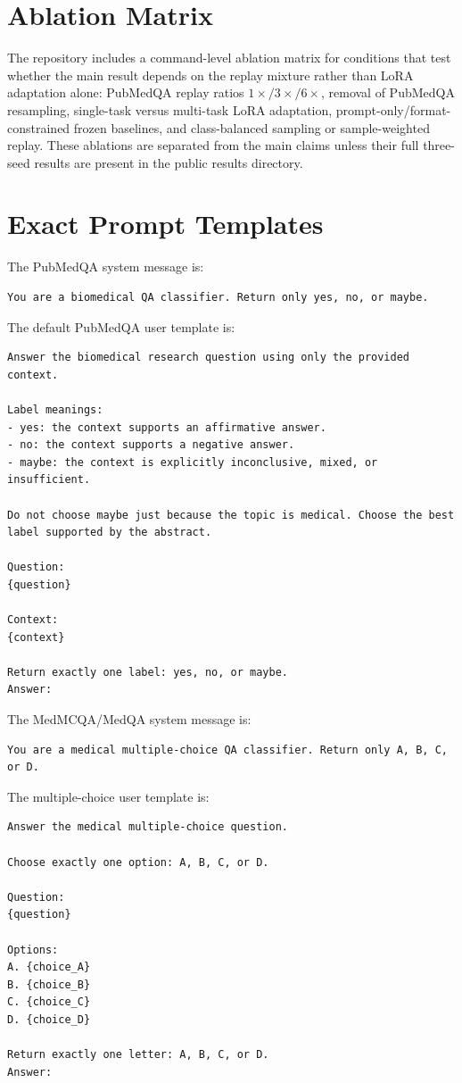\documentclass[11pt]{article}
\begin{document}
\section{Ablation Matrix}

The repository includes a command-level ablation matrix for conditions that test whether the main result depends on the replay mixture rather than LoRA adaptation alone: PubMedQA replay ratios $1\times/3\times/6\times$, removal of PubMedQA resampling, single-task versus multi-task LoRA adaptation, prompt-only/format-constrained frozen baselines, and class-balanced sampling or sample-weighted replay. These ablations are separated from the main claims unless their full three-seed results are present in the public results directory.

\section{Exact Prompt Templates}
\label{app:prompts}

The PubMedQA system message is:
\begin{lstlisting}
You are a biomedical QA classifier. Return only yes, no, or maybe.
\end{lstlisting}

The default PubMedQA user template is:
\begin{lstlisting}
Answer the biomedical research question using only the provided context.

Label meanings:
- yes: the context supports an affirmative answer.
- no: the context supports a negative answer.
- maybe: the context is explicitly inconclusive, mixed, or insufficient.

Do not choose maybe just because the topic is medical. Choose the best label supported by the abstract.

Question:
{question}

Context:
{context}

Return exactly one label: yes, no, or maybe.
Answer:
\end{lstlisting}

The MedMCQA/MedQA system message is:
\begin{lstlisting}
You are a medical multiple-choice QA classifier. Return only A, B, C, or D.
\end{lstlisting}

The multiple-choice user template is:
\begin{lstlisting}
Answer the medical multiple-choice question.

Choose exactly one option: A, B, C, or D.

Question:
{question}

Options:
A. {choice_A}
B. {choice_B}
C. {choice_C}
D. {choice_D}

Return exactly one letter: A, B, C, or D.
Answer:
\end{lstlisting}
\end{document}
